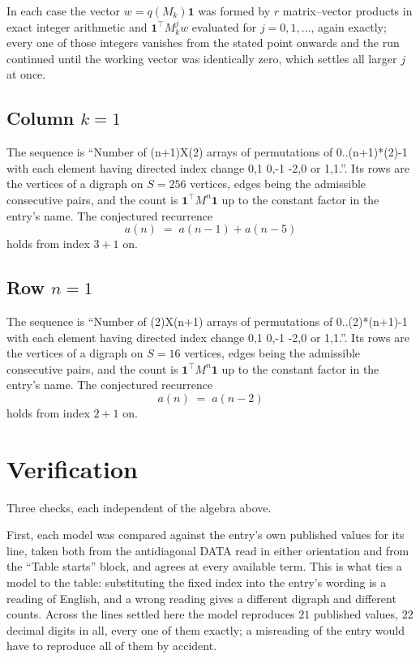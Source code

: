 \documentclass[11pt,a4paper]{article}
\theoremstyle{plain}
\theoremstyle{definition}
\begin{document}
In each case the vector $w=q(M_k)\mathbf{1}$ was formed by $r$ matrix--vector products in
exact integer arithmetic and $\mathbf{1}^{\!\top}M_k^{j}w$ evaluated for $j=0,1,\dots$,
again exactly; every one of those integers vanishes from the stated point onwards and the run
continued until the working vector was identically zero, which settles all larger $j$ at once.

\subsection*{Column $k$$=1$}
The sequence is ``Number of (n+1)X(2) arrays of permutations of 0..(n+1)*(2)-1 with each element having directed index change 0,1 0,-1 -2,0 or 1,1.''. Its rows are the vertices of a digraph on
$S=256$ vertices, edges being the admissible consecutive pairs, and the count is
$\mathbf{1}^{\!\top}M^{n}\mathbf{1}$ up to the constant factor in the entry's name.
The conjectured recurrence
\[
a(n)\;=\;a(n-1) + a(n-5)
\]
holds from index $3+1$ on.

\subsection*{Row $n$$=1$}
The sequence is ``Number of (2)X(n+1) arrays of permutations of 0..(2)*(n+1)-1 with each element having directed index change 0,1 0,-1 -2,0 or 1,1.''. Its rows are the vertices of a digraph on
$S=16$ vertices, edges being the admissible consecutive pairs, and the count is
$\mathbf{1}^{\!\top}M^{n}\mathbf{1}$ up to the constant factor in the entry's name.
The conjectured recurrence
\[
a(n)\;=\;a(n-2)
\]
holds from index $2+1$ on.

\section{Verification}

Three checks, each independent of the algebra above.

First, each model was compared against the entry's own published values for its line, taken
both from the antidiagonal DATA read in either orientation and from the ``Table starts''
block, and agrees at every available term. This is what ties a model to the table:
substituting the fixed index into the entry's wording is a reading of English, and a wrong
reading gives a different digraph and different counts. Across the lines settled here the
model reproduces $21$ published values, $22$ decimal digits in all, every one of
them exactly; a misreading of the entry would have to reproduce all of them by accident.
\end{document}
